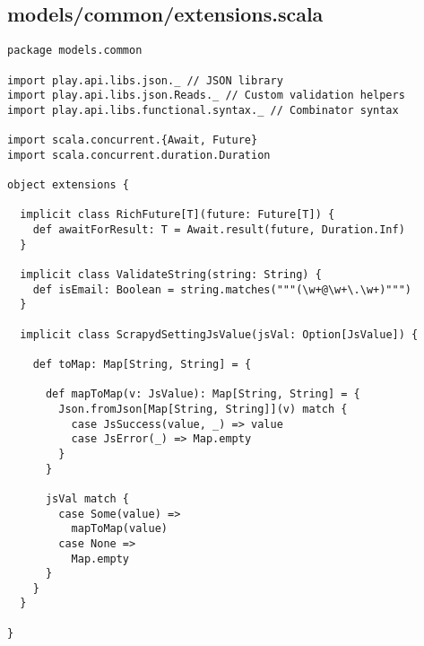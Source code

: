 \subsection{models/common/extensions.scala}
\begin{lstlisting}
package models.common

import play.api.libs.json._ // JSON library
import play.api.libs.json.Reads._ // Custom validation helpers
import play.api.libs.functional.syntax._ // Combinator syntax

import scala.concurrent.{Await, Future}
import scala.concurrent.duration.Duration

object extensions {

  implicit class RichFuture[T](future: Future[T]) {
    def awaitForResult: T = Await.result(future, Duration.Inf)
  }

  implicit class ValidateString(string: String) {
    def isEmail: Boolean = string.matches("""(\w+@\w+\.\w+)""")
  }

  implicit class ScrapydSettingJsValue(jsVal: Option[JsValue]) {

    def toMap: Map[String, String] = {

      def mapToMap(v: JsValue): Map[String, String] = {
        Json.fromJson[Map[String, String]](v) match {
          case JsSuccess(value, _) => value
          case JsError(_) => Map.empty
        }
      }

      jsVal match {
        case Some(value) =>
          mapToMap(value)
        case None =>
          Map.empty
      }
    }
  }

}
\end{lstlisting}
